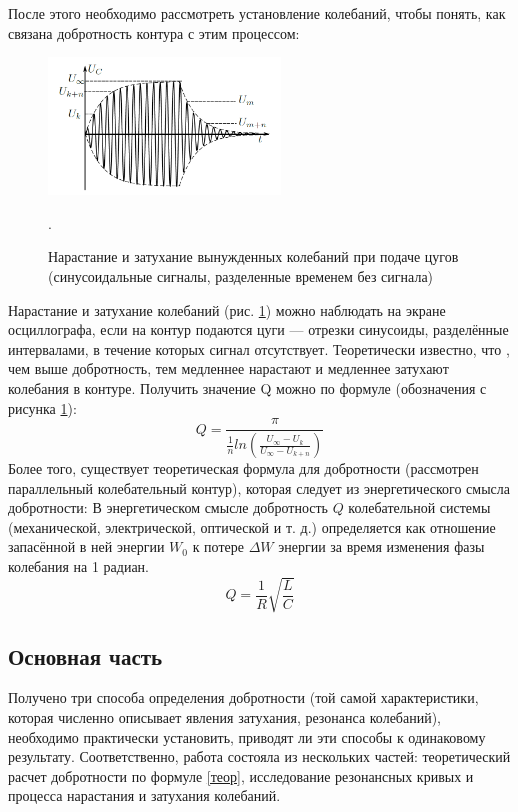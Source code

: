 \documentclass[a4paper,12pt]{article} %
\begin{document}
После этого необходимо рассмотреть установление колебаний, чтобы понять, как связана добротность контура с этим процессом:
\begin{figure}[h!]
\begin{center}
\includegraphics[width=0.55\textwidth]{затухание}
\caption{Нарастание и затухание вынужденных колебаний при подаче цугов (синусоидальные сигналы, разделенные временем без сигнала)} \label{затухание}.
\end{center}
\end{figure} 
Нарастание и затухание колебаний (рис. \ref{затухание}) можно наблюдать на
экране осциллографа, если на контур подаются цуги — отрезки синусоиды,
разделённые интервалами, в течение которых сигнал отсутствует. Теоретически известно, что \cite{labnik}, чем выше добротность, тем медленнее нарастают и медленнее затухают колебания в контуре. Получить значение Q можно по формуле \cite{labnik} (обозначения с рисунка \ref{затухание}):
\begin{equation}
\label{затух}
Q = \frac{\pi}{\frac{1}{n}ln(\frac{U_\infty-U_k}{U_\infty-U_{k+n}})}
\end{equation}
Более того, существует теоретическая формула для добротности (рассмотрен параллельный колебательный контур), которая следует из энергетического смысла добротности: 
В энергетическом смысле добротность $Q$ колебательной системы (механической, электрической, оптической и т. д.) определяется как отношение запасённой в ней энергии $W_0$ к потере $\Delta W$ энергии за время изменения фазы колебания
на 1 радиан.
\begin{equation}
Q = \frac{1}{R}\sqrt{\frac{L}{C}} 
\label{теор}
\end{equation}
\subsection*{Основная часть}
Получено три способа определения добротности (той самой характеристики, которая численно описывает явления затухания, резонанса колебаний), необходимо практически установить, приводят ли эти способы к одинаковому результату. Соответственно, работа состояла из нескольких частей: теоретический расчет добротности по формуле \ref{теор}, исследование резонансных кривых и процесса нарастания и затухания колебаний.
\end{document}
